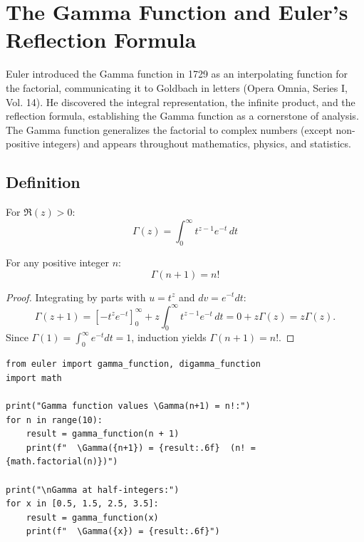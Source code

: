 
\chapter{The Gamma Function and Euler's Reflection Formula}

\begin{historical}
Euler introduced the Gamma function in 1729 as an interpolating function for the factorial,
communicating it to Goldbach in letters (Opera Omnia, Series I, Vol. 14). He discovered
the integral representation, the infinite product, and the reflection formula, establishing
the Gamma function as a cornerstone of analysis. The Gamma function generalizes the factorial
to complex numbers (except non-positive integers) and appears throughout mathematics, physics,
and statistics. \cite{euler1729}\end{historical}

\section{Definition}

\begin{definition}
For $\Re(z) > 0$:
\[
\Gamma(z) = \int_0^\infty t^{z-1} e^{-t}\, dt
\]
\end{definition}

\begin{theorem}
For any positive integer $n$:
\[
\Gamma(n+1) = n!
\]
\end{theorem}

\begin{proof}
Integrating by parts with $u = t^z$ and $dv = e^{-t}dt$:
\[
\Gamma(z+1) = \left[ -t^z e^{-t} \right]_0^\infty + z \int_0^\infty t^{z-1} e^{-t}\, dt = 0 + z\Gamma(z) = z\Gamma(z).
\]
Since $\Gamma(1) = \int_0^\infty e^{-t}dt = 1$, induction yields $\Gamma(n+1) = n!$.
\end{proof}

\begin{lstlisting}[caption={Gamma function values}, label=lst:gamma]
from euler import gamma_function, digamma_function
import math

print("Gamma function values \Gamma(n+1) = n!:")
for n in range(10):
    result = gamma_function(n + 1)
    print(f"  \Gamma({n+1}) = {result:.6f}  (n! = {math.factorial(n)})")

print("\nGamma at half-integers:")
for x in [0.5, 1.5, 2.5, 3.5]:
    result = gamma_function(x)
    print(f"  \Gamma({x}) = {result:.6f}")
\end{lstlisting}

